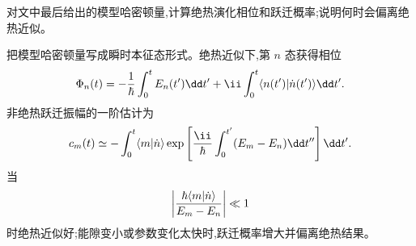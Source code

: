 \begin{question}
对文中最后给出的模型哈密顿量,计算绝热演化相位和跃迁概率;说明何时会偏离绝热近似。
\end{question}
\begin{solution}
把模型哈密顿量写成瞬时本征态形式。绝热近似下,第 $n$ 态获得相位
\[
\Phi_n(t)=-{1\over\hbar}\int_0^tE_n(t')\dd t'+\ii\int_0^t\langle n(t')|\dot n(t')\rangle\dd t'.
\]
非绝热跃迁振幅的一阶估计为
\[
c_m(t)\simeq-\int_0^t\langle m|\dot n\rangle
\exp\left[{\ii\over\hbar}\int_0^{t'}(E_m-E_n)\dd t''\right]\dd t'.
\]
当
\[
\left|{\hbar\langle m|\dot n\rangle\over E_m-E_n}\right|\ll1
\]
时绝热近似好;能隙变小或参数变化太快时,跃迁概率增大并偏离绝热结果。
\end{solution}
